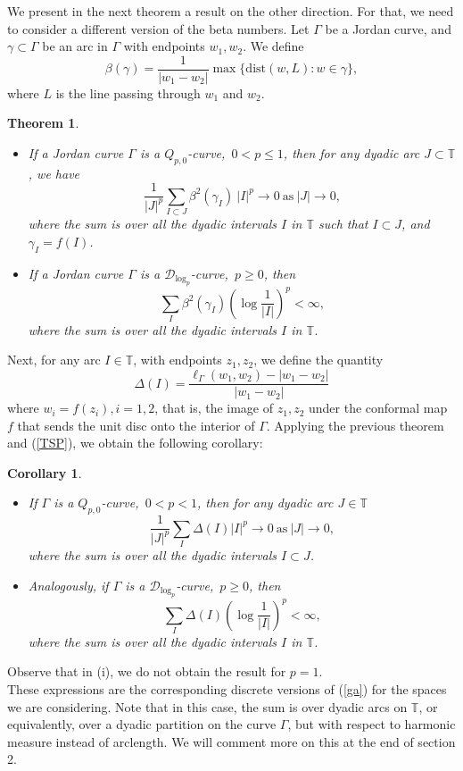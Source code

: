 \documentclass[12pt,a4paper]{article}
\newtheorem{theo}{Theorem}
\newtheorem{coro}{Corollary}
\theoremstyle{definition}
\theoremstyle{remark}
\newcommand{\T}{\mathbb{T}}
\numberwithin{komcounter}{section}
\begin{document}
We present in the next theorem a result on the other direction. For that, we need to consider a different  version of the beta numbers. Let $\Gamma$ be a Jordan curve, and $\gamma\subset  \Gamma$ be an arc in $\Gamma$ with endpoints $w_1, w_2$. We define
\begin{equation}\label{def}\beta (\gamma)= \frac{1}{|w_1-w_2|} \max \{\textrm{dist}(w, L) : w \in \gamma\},\end{equation}
where $L$ is the line passing through $w_1$  and $w_2$.\\ 
\begin{theo}
	 \begin{itemize}
	 	\item[(i)]
	If a Jordan curve $\Gamma$ is a	
 	$ Q_{p,0}$-curve,~$0<p\leq 1$, then for any dyadic arc $J\subset \T$, we have
 	$$
 	\frac{1}{|J|^p}\sum_{ I\subset J} \beta^2(\gamma_I) ~|I|^p \to 0 ~\textrm{as} ~|J|\to 0,
 	$$
 	where the sum is over all the dyadic intervals $I$ in $\T$ such that $I\subset J$, and $\gamma_I=f(I)$.
 	\item[(ii)] If a Jordan curve $\Gamma$ is a	
 	$ \mathcal{D}_{\log_p}$-curve,~$p\geq 0$, then 
 	$$
 	\sum_{ I} \beta^2(\gamma_I) \left(\log \frac{1}{|I|}\right)^p<\infty,
 	$$
 	where the sum is over all the dyadic intervals $I$ in $\T$.
 	\end{itemize}
 \end{theo}

Next, for any  arc $I \in \T$, with endpoints $z_1,z_2$, we define the quantity  
$$\Delta(I)=\frac{ \ell_\Gamma(w_1,w_2)-|w_1-w_2|}{|w_1-w_2|}$$
where  $w_i=f(z_i), i=1,2$, that is, the image of $z_1, z_2$ under the conformal map $f$ that sends the unit disc onto the interior of $\Gamma$.
Applying  the previous theorem and (\ref{TSP}), we obtain the following corollary:


\begin{coro}\begin{itemize}
		\item[(i)] If  $\Gamma$ is a	
	$ Q_{p,0}$-curve,~$0<p< 1$,   then for any dyadic arc $J\in \T$
	$$
	\frac{1}{|J|^p} \sum_{I} \Delta (I) |I|^p  \to 0~ \textrm{as} ~|J|\to 0,
	$$
	where the sum is over all the dyadic intervals $I\subset J$.\\
		\item[(ii)] 
	Analogously, if  $\Gamma$ is a	
	$ \mathcal{D}_{\log_p}$-curve,~$p\geq 0$, then 
	$$
	\sum_{ I} \Delta(I) \left(\log \frac{1}{|I|}\right)^p<\infty,
	$$
	where the sum is over all the dyadic intervals $I$ in $\T$.
\end{itemize}
	\end{coro}
	Observe that in (i), we do not obtain the result for $p=1$. \\
	These expressions are  the corresponding discrete  versions  of (\ref{ga}) for the spaces we are considering. Note that in this case, the sum is over dyadic arcs on $\T$, or equivalently, over a dyadic partition  on the curve $\Gamma$, but   with respect to   harmonic measure  instead of arclength. We will comment more on this at the end of section 2.
	
\end{document}

